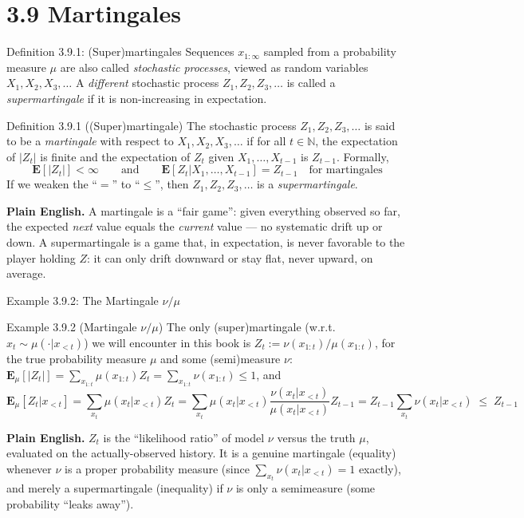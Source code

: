 \documentclass[aspectratio=169,10pt]{beamer}
\newcommand{\N}{\mathbb{N}}
\begin{document}
\section{3.9 Martingales}

\begin{frame}{Definition 3.9.1: (Super)martingales}
  Sequences $x_{1:\infty}$ sampled from a probability measure $\mu$ are also
  called \emph{stochastic processes}, viewed as random variables
  $X_1,X_2,X_3,\dots$ A \emph{different} stochastic process $Z_1,Z_2,Z_3,\dots$
  is called a \emph{supermartingale} if it is non-increasing in expectation.
  \begin{block}{Definition 3.9.1 ((Super)martingale)}
    The stochastic process $Z_1,Z_2,Z_3,\dots$ is said to be a
    \emph{martingale} with respect to $X_1,X_2,X_3,\dots$ if for all
    $t\in\N$, the expectation of $|Z_t|$ is finite and the expectation of
    $Z_t$ given $X_1,\dots,X_{t-1}$ is $Z_{t-1}$. Formally,
    \[
      \mathbf{E}[|Z_t|] < \infty \qquad\text{and}\qquad
      \mathbf{E}[Z_t|X_1,\dots,X_{t-1}] = Z_{t-1} \quad\text{for martingales}
    \]
    If we weaken the ``$=$'' to ``$\le$'', then $Z_1,Z_2,Z_3,\dots$ is a
    \emph{supermartingale}.
  \end{block}
  \textbf{Plain English.} A martingale is a ``fair game'': given everything
  observed so far, the expected \emph{next} value equals the \emph{current}
  value --- no systematic drift up or down. A supermartingale is a game that,
  in expectation, is never favorable to the player holding $Z$: it can only
  drift downward or stay flat, never upward, on average.
\end{frame}

\begin{frame}{Example 3.9.2: The Martingale $\nu/\mu$}
  \begin{block}{Example 3.9.2 (Martingale $\nu/\mu$)}
    The only (super)martingale (w.r.t.\ $x_t\sim\mu(\cdot|x_{<t})$) we will
    encounter in this book is $Z_t := \nu(x_{1:t})/\mu(x_{1:t})$, for the
    true probability measure $\mu$ and some (semi)measure $\nu$:
    $\mathbf{E}_\mu[|Z_t|]=\sum_{x_{1:t}}\mu(x_{1:t})Z_t=\sum_{x_{1:t}}\nu(x_{1:t})\le 1$, and
    \[
      \mathbf{E}_\mu[Z_t|x_{<t}] = \sum_{x_t}\mu(x_t|x_{<t})Z_t
      = \sum_{x_t}\mu(x_t|x_{<t})\frac{\nu(x_t|x_{<t})}{\mu(x_t|x_{<t})}Z_{t-1}
      = Z_{t-1}\sum_{x_t}\nu(x_t|x_{<t}) \; \le \; Z_{t-1}
    \]
  \end{block}
  \textbf{Plain English.} $Z_t$ is the ``likelihood ratio'' of model $\nu$
  versus the truth $\mu$, evaluated on the actually-observed history. It is
  a genuine martingale (equality) whenever $\nu$ is a proper probability
  measure (since $\sum_{x_t}\nu(x_t|x_{<t})=1$ exactly), and merely a
  supermartingale (inequality) if $\nu$ is only a semimeasure (some
  probability ``leaks away'').
\end{frame}
\end{document}
